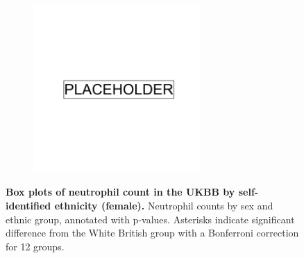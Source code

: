 \begin{figure}[ht]
    \centering
    \begin{subfigure}{\textwidth}
    \includegraphics[width=0.7\textwidth]{placeholder.png}
    \end{subfigure}
    \caption[Box plots of neutrophil count in the UKBB by self-identified ethnicity (female)]{\textbf{Box plots of neutrophil count in the UKBB by self-identified ethnicity (female).} Neutrophil counts by sex and ethnic group, annotated with p-values. Asterisks indicate significant difference from the White British group with a Bonferroni correction for 12 groups.}
    \label{fig:supp_box_neutrophill_f}
\end{figure}

\newpage

